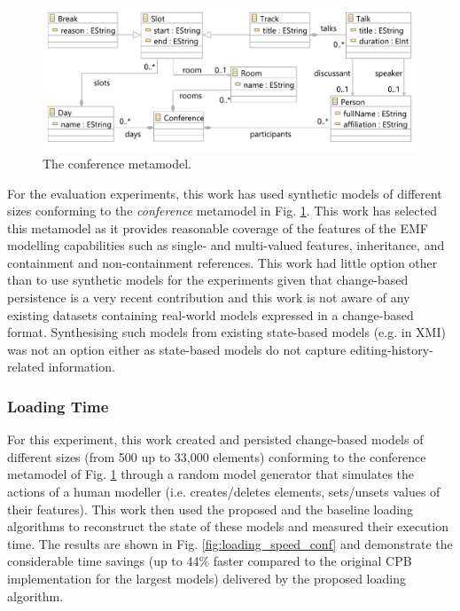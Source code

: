 \documentclass[12pt, a4paper]{report} \usepackage[titletoc]{appendix}
\begin{document}
\begin{figure}[htbp]
	\centering
	\includegraphics[width=0.9\linewidth]{conference_metamodel}
	\caption{The conference metamodel.}   
	\label{fig:node_metamodel}
\end{figure}

For the evaluation experiments, this work has used synthetic models of different sizes conforming to the \emph{conference} metamodel in Fig. \ref{fig:node_metamodel}. This work has selected this metamodel as it provides reasonable coverage of the features of the EMF modelling capabilities such as single- and multi-valued features, inheritance, and containment and non-containment references. This work had little option other than to use synthetic models for the experiments given that change-based persistence is a very recent contribution and this work is not aware of any existing datasets containing real-world models expressed in a change-based format. Synthesising such models from existing state-based models (e.g. in XMI) was not an option either as state-based models do not capture editing-history-related information.    

\subsubsection{Loading Time}
\label{subsec:loading_time_test}

For this experiment, this work created and persisted change-based models of different sizes (from 500 up to 33,000 elements) conforming to the conference metamodel of Fig. \ref{fig:node_metamodel} through a random model generator that simulates the actions of a human modeller (i.e. creates/deletes elements, sets/unsets values of their features). This work then used the proposed and the baseline loading algorithms to reconstruct the state of these models and measured their execution time. The results are shown in Fig. \ref{fig:loading_speed_conf} and demonstrate the considerable time savings (up to 44\% faster compared to the original CPB implementation for the largest models) delivered by the proposed loading algorithm.
\end{document}
